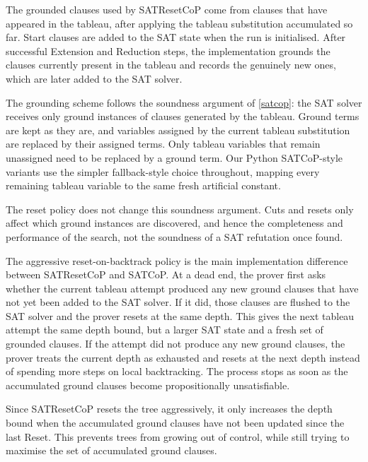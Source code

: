 \documentclass{EasyChair3.5/easychair}
\newcommand{\step}[1]{\textsf{#1}}
\newcommand{\cop}[1]{\textsf{#1}}
\newcommand{\satcopzc}{\cop{SATCoP\textsubscript{0}\textsuperscript{Con}}}
\newcommand{\satcopc}{\cop{SATCoP\textsuperscript{Con}}}
\begin{document}
The grounded clauses used by \cop{SATResetCoP} come from clauses that have appeared in the tableau, after applying the tableau substitution accumulated so far.
Start clauses are added to the SAT state when the run is initialised.
After successful \step{Extension} and \step{Reduction} steps, the implementation grounds the clauses currently present in the tableau and records the genuinely new ones, which are later added to the SAT solver.

The grounding scheme follows the soundness argument of \cref{satcop}: the SAT solver receives only ground instances of clauses generated by the tableau.
Ground terms are kept as they are, and variables assigned by the current tableau substitution are replaced by their assigned terms.
Only tableau variables that remain unassigned need to be replaced by a ground term.
Our Python \cop{SATCoP}-style variants use the simpler fallback-style choice throughout, mapping every remaining tableau variable to the same fresh artificial constant.

The reset policy does not change this soundness argument.
Cuts and resets only affect which ground instances are discovered, and hence the completeness and performance of the search, not the soundness of a SAT refutation once found.

The aggressive reset-on-backtrack policy is the main implementation difference between \cop{SATResetCoP} and \cop{SATCoP}.
At a dead end, the prover first asks whether the current tableau attempt produced any new ground clauses that have not yet been added to the SAT solver.
If it did, those clauses are flushed to the SAT solver and the prover resets at the same depth.
This gives the next tableau attempt the same depth bound, but a larger SAT state and a fresh set of grounded clauses.
If the attempt did not produce any new ground clauses, the prover treats the current depth as exhausted and resets at the next depth instead of spending more steps on local backtracking.
The process stops as soon as the accumulated ground clauses become propositionally unsatisfiable.

Since \cop{SATResetCoP} resets the tree aggressively, it only increases the depth bound when the accumulated ground clauses have not been updated since the last \step{Reset}.
This prevents trees from growing out of control, while still trying to maximise the set of accumulated ground clauses.
\end{document}
